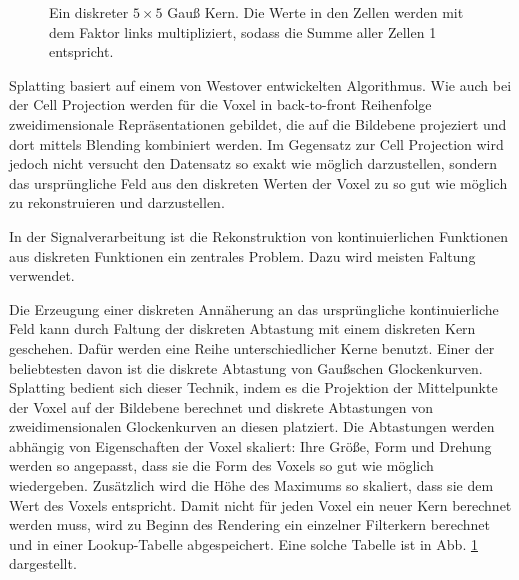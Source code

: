 \documentclass[a4paper,fontsize=12pt,toc=bib,halfparskip]{scrartcl}
\begin{document}
\begin{figure}
	\centering
	\caption{Ein diskreter $5\times5$ Gau{\ss} Kern. Die Werte in den Zellen werden mit dem Faktor links multipliziert, sodass die Summe aller Zellen 1 entspricht.}
	\label{kernel}
\end{figure}

Splatting basiert auf einem von Westover entwickelten Algorithmus\cite{westover1989interactive}\cite{westover1990footprint}. Wie auch bei der Cell Projection werden f\"ur die Voxel in back-to-front Reihenfolge zweidimensionale Repr\"asentationen gebildet, die auf die Bildebene projeziert und dort mittels Blending kombiniert werden. Im Gegensatz zur Cell Projection wird jedoch nicht versucht den Datensatz so exakt wie m\"oglich darzustellen, sondern das urspr\"ungliche Feld aus den diskreten Werten der Voxel zu so gut wie m\"oglich zu rekonstruieren und darzustellen. 

In der Signalverarbeitung ist die Rekonstruktion von kontinuierlichen Funktionen aus diskreten Funktionen ein zentrales Problem. Dazu wird meisten Faltung verwendet. 

Die Erzeugung einer diskreten Ann\"aherung an das urspr\"ungliche kontinuierliche Feld kann durch Faltung der diskreten Abtastung mit einem diskreten Kern geschehen. Daf\"ur werden eine Reihe unterschiedlicher Kerne benutzt. Einer der beliebtesten davon ist die diskrete Abtastung von Gau{\ss}schen Glockenkurven. Splatting bedient sich dieser Technik, indem es die Projektion der Mittelpunkte der Voxel auf der Bildebene berechnet und diskrete Abtastungen von zweidimensionalen Glockenkurven an diesen platziert. Die Abtastungen werden abh\"angig von Eigenschaften der Voxel skaliert: Ihre Gr\"o{\ss}e, Form und Drehung werden so angepasst, dass sie die Form des Voxels so gut wie m\"oglich wiedergeben. Zus\"atzlich wird die H\"ohe des Maximums so skaliert, dass sie dem Wert des Voxels entspricht. Damit nicht f\"ur jeden Voxel ein neuer Kern berechnet werden muss, wird zu Beginn des Rendering ein einzelner Filterkern berechnet und in einer Lookup-Tabelle abgespeichert. Eine solche Tabelle ist in Abb. \ref{kernel} dargestellt.
\end{document}
